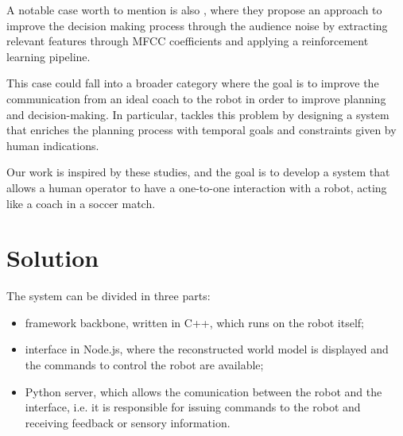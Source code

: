 \documentclass[a4paper, onecolumn, 12pt]{article}
\begin{document}
A notable case worth to mention is also \cite{antonioni}, where they propose an
approach to improve the decision making process through the audience noise by
extracting relevant features through MFCC coefficients and applying a
reinforcement learning pipeline. 

This case could fall into a broader category where the goal is to improve the
communication from an ideal coach to the robot in order to improve planning and
decision-making. In particular, \cite{musumeci} tackles this problem by
designing a system that enriches the planning process with temporal goals and
constraints given by human indications. 

Our work is inspired by these studies, and the goal is to develop a system that
allows a human operator to have a one-to-one interaction with a robot, acting
like a coach in a soccer match.

\newpage
\section{Solution}
\label{sec:sol}

The system can be divided in three parts: 
    \begin{itemize}
        \item framework backbone, written in C++, which runs on the robot itself;
        \item interface in Node.js, where the reconstructed world
        model is displayed and the commands to control the robot are available; 
        \item Python server, which allows the comunication between the robot 
        and the interface, i.e. it is responsible for issuing commands to the robot 
        and receiving feedback or sensory information. 
    \end{itemize}
\end{document}
